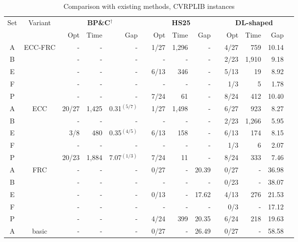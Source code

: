 \documentclass{article}
\newcommand{\rev}[1]{{\color{black}#1}}
\newcommand{\tighttable}{%
  \setlength{\tabcolsep}{3pt}        %
  \renewcommand{\arraystretch}{1} %
}
\begin{document}
\begin{table}[htbp]
    \caption{Comparison with existing methods, CVRPLIB instances \citep{uchoa2017new}}
    \label{tab:CVRP}
    \centering
    \small
    \tighttable
    \begin{tabular*}{\textwidth}{@{\extracolsep{\fill}}ccrrrrrrrrrrrr}
    \toprule
    \multicolumn{1}{c}{\multirow{2}{*}{Set}} & \multicolumn{1}{c}{\multirow{2}{*}{Variant}} & \multicolumn{3}{c}{\rev{\textbf{BP\&C}$^\dagger$}} &  & \multicolumn{3}{c}{\textbf{HS25}} &  & \multicolumn{3}{c}{\textbf{DL-shaped}} \\
    \cmidrule{3-5} \cmidrule{7-9} \cmidrule{11-13}
    & & \rev{Opt} & \rev{Time} & \rev{Gap} & & Opt & Time & Gap & & Opt & Time & Gap \\ \hline
    A & \multirow{5}{*}{ECC-FRC} & - & - & - & & 1/27 & 1,296 & - & & 4/27 & 759 & 10.14 \\
    B & & - & - & - & & - & - & - & & 2/23 & 1,910 & 9.18 \\
    E & & - & - & - & & 6/13 & 346 & - & & 5/13 & 19 & 8.92 \\
    F & & - & - & - & & - & - & - & & 1/3 & 5 & 1.78 \\
    P & & - & - & - & & 7/24 & 61 & - & & 8/24 & 412 & 10.40 \\ \hline
    A & \multirow{5}{*}{ECC} & \rev{20/27} & \rev{1,425} & \rev{0.31$^{(5/7)}$} & & 1/27 & 1,498 & - & & 6/27 & 923 & 8.27 \\
    B & & - & - & - & & - & - & - & & 2/23 & 1,266 & 5.95 \\
    E & & \rev{3/8} & \rev{480} & \rev{0.35$^{(4/5)}$} & & 6/13 & 158 & - & & 6/13 & 174 & 8.15 \\
    F & & - & - & - & & - & - & - & & 1/3 & 6 & 2.07 \\
    P & & \rev{20/23} & \rev{1,884} & \rev{7.07$^{(1/3)}$} & & 7/24 & 11 & - & & 8/24 & 333 & 7.46 \\ \hline
    A & \multirow{5}{*}{FRC} & - & - & - & & 0/27 & - & 20.39 & & 0/27 & - & 36.98 \\
    B & & - & - & - & & - & - & - & & 0/23 & - & 38.07 \\
    E & & - & - & - & & 0/13 & - & 17.62 & & 4/13 & 276 & 21.53 \\
    F & & - & - & - & & - & - & - & & 0/3 & - & 17.12 \\
    P & & - & - & - & & 4/24 & 399 & 20.35 & & 6/24 & 218 & 19.63 \\ \hline
    A & \multirow{5}{*}{basic} & - & - & - & & 0/27 & - & 26.49 & & 0/27 & - & 58.58 \\

\end{tabular*}
\end{table}
\end{document}
